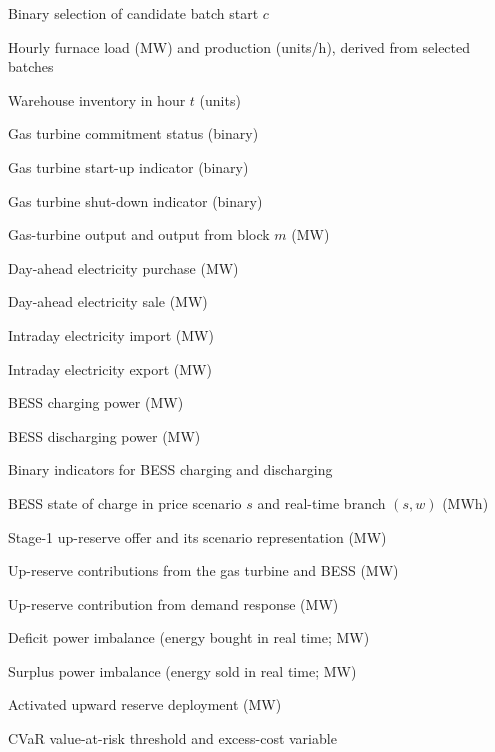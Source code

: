 \documentclass[5p,times,twocolumn]{elsarticle}
\newenvironment{nomlist}{%
  \begingroup\footnotesize
  \list{}{%
    \setlength{\labelwidth}{0.27\columnwidth}%
    \setlength{\labelsep}{4pt}%
    \setlength{\leftmargin}{\dimexpr\labelwidth+\labelsep\relax}%
    \setlength{\itemsep}{0.5pt}\setlength{\parsep}{0pt}%
    \setlength{\topsep}{1pt}\setlength{\partopsep}{0pt}%
    \renewcommand{\makelabel}[1]{##1\hfil}}%
}{\endlist\endgroup}
\newcommand{\nomheading}[1]{%
  \Needspace{4\baselineskip}%
  \par\vspace{3pt}\noindent{\footnotesize\bfseries\itshape #1}\par\vspace{1pt}}
\newcommand{\nomitem}[2]{\item[#1] #2}
\begin{document}
\nomheading{Decision variables}
\begin{nomlist}
\nomitem{$s_c$}{Binary selection of candidate batch start $c$}
\nomitem{$P_{\mathrm{factory},t},n_{\mathrm{prod},t}$}{Hourly furnace load (MW) and production (units/h), derived from selected batches}
\nomitem{$N_t$}{Warehouse inventory in hour $t$ (units)}
\nomitem{$u_{\mathrm{GT},t}$}{Gas turbine commitment status (binary)}
\nomitem{$x_{\mathrm{GT},t}$}{Gas turbine start-up indicator (binary)}
\nomitem{$y_{\mathrm{GT},t}$}{Gas turbine shut-down indicator (binary)}
\nomitem{$P_{\mathrm{GT},t,s},P_{\mathrm{GT},m,t,s}$}{Gas-turbine output and output from block $m$ (MW)}
\nomitem{$P_{\mathrm{buy},t,s}^{\mathrm{DA}}$}{Day-ahead electricity purchase (MW)}
\nomitem{$P_{\mathrm{sell},t,s}^{\mathrm{DA}}$}{Day-ahead electricity sale (MW)}
\nomitem{$P_{\mathrm{buy},t,s}^{\mathrm{ID}}$}{Intraday electricity import (MW)}
\nomitem{$P_{\mathrm{sell},t,s}^{\mathrm{ID}}$}{Intraday electricity export (MW)}
\nomitem{$P_{\mathrm{ch},t,s}^{\mathrm{BESS}}$}{BESS charging power (MW)}
\nomitem{$P_{\mathrm{dis},t,s}^{\mathrm{BESS}}$}{BESS discharging power (MW)}
\nomitem{$v_{\mathrm{ch},t,s},v_{\mathrm{dis},t,s}$}{Binary indicators for BESS charging and discharging}
\nomitem{$SoC_{t,s},SoC_{t,s,w}$}{BESS state of charge in price scenario $s$ and real-time branch $(s,w)$ (MWh)}
\nomitem{$R_{t}^{\mathrm{up}},R_{t,s}^{\mathrm{up}}$}{Stage-1 up-reserve offer and its scenario representation (MW)}
\nomitem{$R_{t,s}^{\mathrm{GT}},R_{t,s}^{\mathrm{dis}},R_{t,s}^{\mathrm{ch}}$}{Up-reserve contributions from the gas turbine and BESS (MW)}
\nomitem{$R_{\mathrm{factory},t,s}^{\mathrm{DR}}$}{Up-reserve contribution from demand response (MW)}
\nomitem{$\Delta_{t,s,w}^{+}$}{Deficit power imbalance (energy bought in real time; MW)}
\nomitem{$\Delta_{t,s,w}^{-}$}{Surplus power imbalance (energy sold in real time; MW)}
\nomitem{$\rho_{t,s,w}$}{Activated upward reserve deployment (MW)}
\nomitem{$\eta,\zeta_k$}{CVaR value-at-risk threshold and excess-cost variable}
\end{nomlist}
\end{document}
